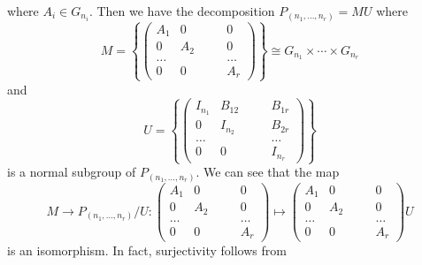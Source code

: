 where $A_i\in G_{n_i}$. Then we have the decomposition $P_{(n_1,\dots,n_r)}=MU$ where
\begin{equation}
    M =\left\{\left(\begin{smallmatrix}
         A_1 & 0&\quad &0\\
         0 & A_2& &0\\
          \dots& & &\dots\\
           0 & 0& &A_r
    \end{smallmatrix}\right)\right\}\cong G_{n_1}\times\cdots \times G_{n_r}
\end{equation}
and
\begin{equation}
    U = \left\{\left(\begin{smallmatrix}
         I_{n_1} & B_{12}&\quad &B_{1r}\\
         0 & I_{n_2}& &B_{2r}\\
          \dots& & &\dots\\
           0 & 0& &I_{n_r}
    \end{smallmatrix}\right)\right\}
\end{equation}
is a normal subgroup of $P_{(n_1,\dots,n_r)}$. We can see that the map 
\begin{equation}
    M \rightarrow P_{(n_1,\dots,n_r)}/U: \left(\begin{smallmatrix}
        A_1 & 0&\quad &0\\
         0 & A_2& &0\\
          \dots& & &\dots\\
           0 & 0& &A_r
    \end{smallmatrix}\right)
    \mapsto \left(\begin{smallmatrix}
        A_1 & 0&\quad &0\\
         0 & A_2& &0\\
          \dots& & &\dots\\
           0 & 0& &A_r
    \end{smallmatrix}\right)U
\end{equation}
is an isomorphism. In fact, surjectivity follows from

